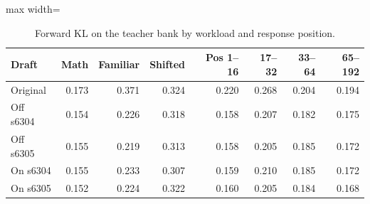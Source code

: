 \begin{table}[!htb]
\centering
\scriptsize
\setlength{\tabcolsep}{3.5pt}
\caption{Forward KL on the teacher bank by workload and response position.}
\label{tab:t3distdomain}
\begin{adjustbox}{max width=\linewidth}
\begin{tabular}{lrrrrrrr}
\toprule
Draft & Math & Familiar & Shifted & Pos 1--16 & 17--32 & 33--64 & 65--192 \\
\midrule
Original & 0.173 & 0.371 & 0.324 & 0.220 & 0.268 & 0.204 & 0.194 \\
Off s6304 & 0.154 & 0.226 & 0.318 & 0.158 & 0.207 & 0.182 & 0.175 \\
Off s6305 & 0.155 & 0.219 & 0.313 & 0.158 & 0.205 & 0.185 & 0.172 \\
On s6304 & 0.155 & 0.233 & 0.307 & 0.159 & 0.210 & 0.185 & 0.172 \\
On s6305 & 0.152 & 0.224 & 0.322 & 0.160 & 0.205 & 0.184 & 0.168 \\
\bottomrule
\end{tabular}
\end{adjustbox}
\end{table}
